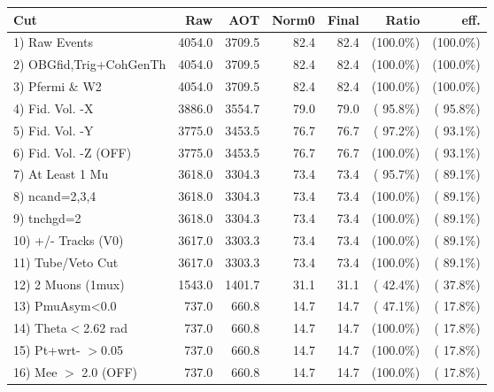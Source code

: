  \begin{table}[h!]\centering
 \begin{tabular}{||l||r|r|r|r|r|r||}
 \hline
 \hline
 Cut & Raw & AOT & Norm0 & Final & Ratio & eff.       \\
 \hline
  1) Raw Events           &       4054.0 &       3709.5 &         82.4 &         82.4 & (100.0\%) & (100.0\%) \\
  2) OBGfid,Trig+CohGenTh &       4054.0 &       3709.5 &         82.4 &         82.4 & (100.0\%) & (100.0\%) \\
  3) Pfermi \& W2         &       4054.0 &       3709.5 &         82.4 &         82.4 & (100.0\%) & (100.0\%) \\
  4) Fid. Vol. -X         &       3886.0 &       3554.7 &         79.0 &         79.0 & ( 95.8\%) & ( 95.8\%) \\
  5) Fid. Vol. -Y         &       3775.0 &       3453.5 &         76.7 &         76.7 & ( 97.2\%) & ( 93.1\%) \\
  6) Fid. Vol. -Z (OFF)   &       3775.0 &       3453.5 &         76.7 &         76.7 & (100.0\%) & ( 93.1\%) \\
  7) At Least 1 Mu        &       3618.0 &       3304.3 &         73.4 &         73.4 & ( 95.7\%) & ( 89.1\%) \\
  8) ncand=2,3,4          &       3618.0 &       3304.3 &         73.4 &         73.4 & (100.0\%) & ( 89.1\%) \\
  9) tnchgd=2             &       3618.0 &       3304.3 &         73.4 &         73.4 & (100.0\%) & ( 89.1\%) \\
 10) +/- Tracks (V0)      &       3617.0 &       3303.3 &         73.4 &         73.4 & (100.0\%) & ( 89.1\%) \\
 11) Tube/Veto Cut        &       3617.0 &       3303.3 &         73.4 &         73.4 & (100.0\%) & ( 89.1\%) \\
 12) 2 Muons (1mux)       &       1543.0 &       1401.7 &         31.1 &         31.1 & ( 42.4\%) & ( 37.8\%) \\
 13) PmuAsym<0.0          &        737.0 &        660.8 &         14.7 &         14.7 & ( 47.1\%) & ( 17.8\%) \\
 14) Theta$<$2.62 rad     &        737.0 &        660.8 &         14.7 &         14.7 & (100.0\%) & ( 17.8\%) \\
 15) Pt+wrt- $>$0.05      &        737.0 &        660.8 &         14.7 &         14.7 & (100.0\%) & ( 17.8\%) \\
 16) Mee $>$ 2.0  (OFF)   &        737.0 &        660.8 &         14.7 &         14.7 & (100.0\%) & ( 17.8\%) \\

\end{tabular}
\end{table}
